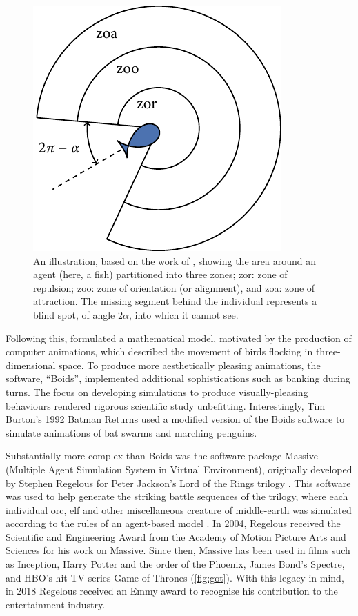 \begin{figure}[tb]
  \includegraphics{zonal_tikz.pdf}
  \caption{An illustration, based on the work of \textcite{aoki82}, showing the
    area around an agent (here, a fish) partitioned into three zones; zor:
    zone of repulsion; zoo: zone of orientation (or alignment), and zoa: zone
    of attraction. The missing segment behind the individual represents a blind
    spot, of angle $2\alpha$, into which it cannot see.}
  \label{fig:zone_illustration}
\end{figure}

Following this, \textcite{reynolds87} formulated a mathematical model,
motivated by the production of computer animations, which described the
movement of birds flocking in three-dimensional space. To produce more
aesthetically pleasing animations, the software, ``Boids'', implemented
additional sophistications such as banking during turns. The focus on
developing simulations to produce visually-pleasing behaviours rendered
rigorous scientific study unbefitting. Interestingly, Tim Burton's 1992 Batman
Returns used a modified version of the Boids software to simulate animations of
bat swarms and marching penguins.

Substantially more complex than Boids was the software package Massive
(Multiple Agent Simulation System in Virtual Environment), originally developed
by Stephen Regelous for Peter Jackson's Lord of the Rings trilogy
\parencite{koeppel02}. This software was used to help generate the striking
battle sequences of the trilogy, where each individual orc, elf and other
miscellaneous creature of middle-earth was simulated according to the rules of
an agent-based model \parencite{robbins17}. In 2004, Regelous received the
Scientific and Engineering Award from the Academy of Motion Picture Arts and
Sciences for his work on Massive. Since then, Massive has been used in films
such as Inception, Harry Potter and the order of the Phoenix, James Bond's
Spectre, and HBO's hit TV series Game of Thrones (\cref{fig:got}). With this
legacy in mind, in 2018 Regelous received an Emmy award to recognise his
contribution to the entertainment industry.


